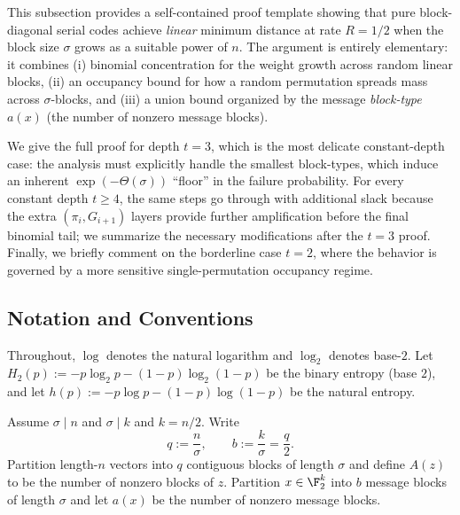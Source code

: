 
\label{ssec:lin-dist-all-tge3}
\label{ssec:bd_template}

This subsection provides a self-contained proof template showing that pure block-diagonal serial codes achieve
\emph{linear} minimum distance at rate $R=1/2$ when the block size $\sigma$ grows as a suitable power of $n$.
The argument is entirely elementary: it combines (i) binomial concentration for the weight growth across random linear blocks,
(ii) an occupancy bound for how a random permutation spreads mass across $\sigma$-blocks, and (iii) a union bound organized by
the message \emph{block-type} $a(x)$ (the number of nonzero message blocks).

We give the full proof for depth $t=3$, which is the most delicate constant-depth case: the analysis must explicitly handle
the smallest block-types, which induce an inherent $\exp(-\Theta(\sigma))$ ``floor'' in the failure probability.
For every constant depth $t\ge 4$, the same steps go through with additional slack because the extra
$(\pi_i,G_{i+1})$ layers provide further amplification before the final binomial tail; we summarize the necessary modifications
after the $t=3$ proof.
Finally, we briefly comment on the borderline case $t=2$, where the behavior is governed by a more sensitive single-permutation
occupancy regime.





\subsection{Notation and Conventions}
Throughout, $\log$ denotes the natural logarithm and $\log_2$ denotes base-$2$.
Let $H_2(p) := -p\log_2 p -(1-p)\log_2(1-p)$ be the binary entropy (base $2$), and
let $h(p):=-p\log p -(1-p)\log(1-p)$ be the natural entropy.

Assume $\sigma\mid n$ and $\sigma\mid k$ and $k=n/2$.
Write
\[
q := \frac{n}{\sigma},
\qquad
b := \frac{k}{\sigma}=\frac{q}{2}.
\]
Partition length-$n$ vectors into $q$ contiguous blocks of length $\sigma$ and define
$A(z)$ to be the number of nonzero blocks of $z$.
Partition $x\in\F_2^k$ into $b$ message blocks of length $\sigma$ and let $a(x)$ be the number of nonzero message blocks.

